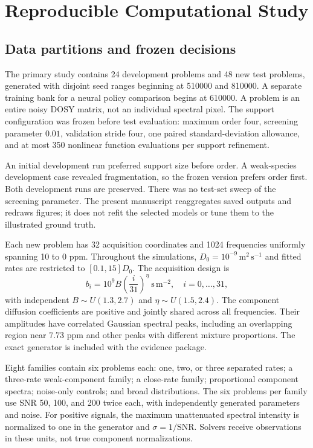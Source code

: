 \section{Reproducible Computational Study}\label{sec:experiments}
\subsection{Data partitions and frozen decisions}
The primary study contains 24 development problems and 48 new test problems, generated with disjoint seed ranges beginning at 510000 and 810000. A separate training bank for a neural policy comparison begins at 610000. A problem is an entire noisy DOSY matrix, not an individual spectral pixel. The support configuration was frozen before test evaluation: maximum order four, screening parameter $0.01$, validation stride four, one paired standard-deviation allowance, and at most 350 nonlinear function evaluations per support refinement.

An initial development run preferred support size before order. A weak-species development case revealed fragmentation, so the frozen version prefers order first. Both development runs are preserved. There was no test-set sweep of the screening parameter. The present manuscript reaggregates saved outputs and redraws figures; it does not refit the selected models or tune them to the illustrated ground truth.

Each new problem has 32 acquisition coordinates and 1024 frequencies uniformly spanning 10 to 0 ppm. Throughout the simulations, $D_0=10^{-9}\,\mathrm{m^2\,s^{-1}}$ and fitted rates are restricted to $[0.1,15]D_0$. The acquisition design is
\begin{equation}\label{eq:design}
 b_i=10^9 B\left(\frac{i}{31}\right)^\eta\ \mathrm{s\,m^{-2}},
 \quad i=0,\ldots,31,
\end{equation}
with independent $B\sim U(1.3,2.7)$ and $\eta\sim U(1.5,2.4)$. The component diffusion coefficients are positive and jointly shared across all frequencies. Their amplitudes have correlated Gaussian spectral peaks, including an overlapping region near 7.73 ppm and other peaks with different mixture proportions. The exact generator is included with the evidence package.

Eight families contain six problems each: one, two, or three separated rates; a three-rate weak-component family; a close-rate family; proportional component spectra; noise-only controls; and broad distributions. The six problems per family use SNR 50, 100, and 200 twice each, with independently generated parameters and noise. For positive signals, the maximum unattenuated spectral intensity is normalized to one in the generator and $\sigma=1/\mathrm{SNR}$. Solvers receive observations in these units, not true component normalizations.

